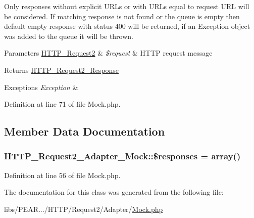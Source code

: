 Only responses without explicit U\-R\-Ls or with U\-R\-Ls equal to request U\-R\-L will be considered. If matching response is not found or the queue is empty then default empty response with status 400 will be returned, if an Exception object was added to the queue it will be thrown.


\begin{DoxyParams}[1]{Parameters}
\hyperlink{classHTTP__Request2}{H\-T\-T\-P\-\_\-\-Request2} & {\em \$request} & H\-T\-T\-P request message\\
\hline
\end{DoxyParams}
\begin{DoxyReturn}{Returns}
\hyperlink{classHTTP__Request2__Response}{H\-T\-T\-P\-\_\-\-Request2\-\_\-\-Response} 
\end{DoxyReturn}

\begin{DoxyExceptions}{Exceptions}
{\em Exception} & \\
\hline
\end{DoxyExceptions}


Definition at line 71 of file Mock.\-php.



\subsection{Member Data Documentation}
\hypertarget{classHTTP__Request2__Adapter__Mock_a2717aa3ac157e464e3c71892bb4dd1a1}{
\subsubsection[{\$responses}]{\setlength{\rightskip}{0pt plus 5cm}H\-T\-T\-P\-\_\-\-Request2\-\_\-\-Adapter\-\_\-\-Mock\-::\$responses = array()\hspace{0.3cm}{\ttfamily [protected]}}}\label{classHTTP__Request2__Adapter__Mock_a2717aa3ac157e464e3c71892bb4dd1a1}


Definition at line 56 of file Mock.\-php.



The documentation for this class was generated from the following file\-:\begin{DoxyCompactItemize}
\item 
libs/\-P\-E\-A\-R.../\-H\-T\-T\-P/\-Request2/\-Adapter/\hyperlink{Mock_8php}{Mock.\-php}\end{DoxyCompactItemize}
